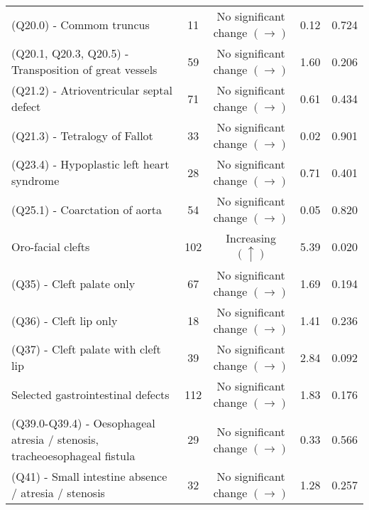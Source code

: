 \documentclass[
]{krantz}
\begin{document}
\begin{longtable}[t]{>{\raggedright\arraybackslash}p{4cm}cccc}
(Q20.0) - Commom truncus & 11 & \makecell[c]{No significant \\ change $\left(\rightarrow \right)$} & 0.12 & 0.724\\
(Q20.1, Q20.3, Q20.5) - Transposition of great vessels & 59 & \makecell[c]{No significant \\ change $\left(\rightarrow \right)$} & 1.60 & 0.206\\
\addlinespace
(Q21.2) - Atrioventricular septal defect & 71 & \makecell[c]{No significant \\ change $\left(\rightarrow \right)$} & 0.61 & 0.434\\
(Q21.3) - Tetralogy of Fallot & 33 & \makecell[c]{No significant \\ change $\left(\rightarrow \right)$} & 0.02 & 0.901\\
(Q23.4) - Hypoplastic left heart syndrome & 28 & \makecell[c]{No significant \\ change $\left(\rightarrow \right)$} & 0.71 & 0.401\\
(Q25.1) - Coarctation of aorta & 54 & \makecell[c]{No significant \\ change $\left(\rightarrow \right)$} & 0.05 & 0.820\\
Oro-facial clefts & 102 & Increasing $\left(\uparrow \right)$ & 5.39 & 0.020\\
\addlinespace
(Q35) - Cleft palate only & 67 & \makecell[c]{No significant \\ change $\left(\rightarrow \right)$} & 1.69 & 0.194\\
(Q36) - Cleft lip only & 18 & \makecell[c]{No significant \\ change $\left(\rightarrow \right)$} & 1.41 & 0.236\\
(Q37) - Cleft palate with cleft lip & 39 & \makecell[c]{No significant \\ change $\left(\rightarrow \right)$} & 2.84 & 0.092\\
Selected gastrointestinal defects & 112 & \makecell[c]{No significant \\ change $\left(\rightarrow \right)$} & 1.83 & 0.176\\
(Q39.0-Q39.4) - Oesophageal atresia / stenosis, tracheoesophageal fistula & 29 & \makecell[c]{No significant \\ change $\left(\rightarrow \right)$} & 0.33 & 0.566\\
\addlinespace
(Q41) - Small intestine absence / atresia / stenosis & 32 & \makecell[c]{No significant \\ change $\left(\rightarrow \right)$} & 1.28 & 0.257\\

\end{longtable}
\end{document}
